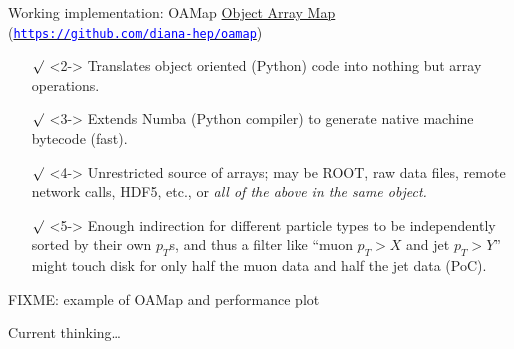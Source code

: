 \documentclass[aspectratio=169]{beamer}
\begin{document}
\begin{frame}{Working implementation: OAMap}
\vspace{0.5 cm}
\underline{Object Array Map} (\href{https://github.com/diana-hep/oamap}{\textcolor{blue}{\tt https://github.com/diana-hep/oamap}})

\vspace{0.25 cm}
\begin{itemize}\setlength{\itemsep}{0.25 cm}
\item[$\surd$]<2-> Translates object oriented (Python) code into nothing but array operations.
\item[$\surd$]<3-> Extends Numba (Python compiler) to generate native machine bytecode (fast).
\item[$\surd$]<4-> Unrestricted source of arrays; may be ROOT, raw data files, remote network calls, HDF5, etc., or {\it all of the above in the same object.}
\item[$\surd$]<5-> Enough indirection for different particle types to be independently sorted by their own $p_T$s, and thus a filter like ``muon $p_T > X$ and jet $p_T > Y$'' might touch disk for only half the muon data and half the jet data (PoC).
\end{itemize}
\end{frame}

\begin{frame}{}
FIXME: example of OAMap and performance plot
\end{frame}

\begin{frame}{Current thinking\ldots}
\vspace{0.5 cm}
\begin{center}
\end{center}
\end{frame}
\end{document}
